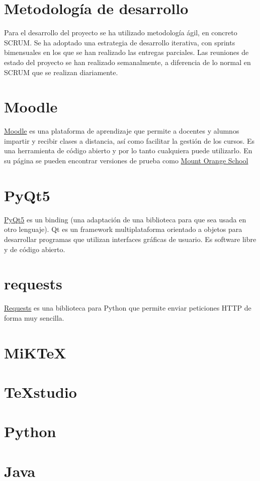 
\section{Metodología de desarrollo}

Para el desarrollo del proyecto se ha utilizado metodología ágil, en concreto SCRUM. Se ha adoptado una estrategia de desarrollo iterativa, con sprints bimensuales en los que se han realizado las entregas parciales. Las reuniones de estado del proyecto se han realizado semanalmente, a diferencia de lo normal en SCRUM que se realizan diariamente.

\section{Moodle}

\href{https://moodle.org/}{Moodle} es una plataforma de aprendizaje que permite a docentes y alumnos impartir y recibir clases a distancia, así como facilitar la gestión de los cursos. Es una herramienta de código abierto y por lo tanto cualquiera puede utilizarlo. En su página se pueden encontrar versiones de prueba como \href{https://school.moodledemo.net/}{Mount Orange School}

\section{PyQt5}

\href{https://doc.qt.io/qtforpython/}{PyQt5} es un binding (una adaptación de una biblioteca para que sea usada en otro lenguaje). Qt es un framework multiplataforma orientado a objetos para desarrollar programas que utilizan interfaces gráficas de usuario. Es software libre y de código abierto.

\section{requests}

\href{https://requests.readthedocs.io/es/latest/}{Requests} es una biblioteca para Python que permite enviar peticiones HTTP de forma muy sencilla.

\section{MiKTeX}


\section{TeXstudio}

\section{Python}

\section{Java}

